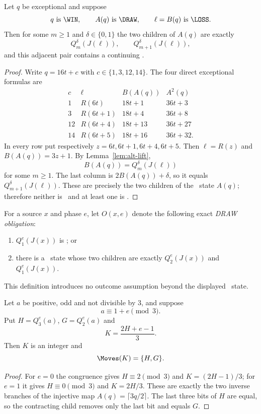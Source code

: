 \begin{lemma}\label{lem:exceptional-side}
Let $q$ be exceptional and suppose
\[
 q\text{ is \WIN},\qquad A(q)\text{ is \DRAW},\qquad
 \ell=B(q)\text{ is \LOSS}.
\]
Then for some $m\ge1$ and $\delta\in\{0,1\}$ the two children of $A(q)$ are
exactly
\[
  Q_m^\delta(J(\ell)),\qquad Q_{m+1}^\delta(J(\ell)),
\]
and this adjacent pair contains a continuing \DRAW.
\end{lemma}

\begin{proof}
Write $q=16t+c$ with $c\in\{1,3,12,14\}$. The four direct exceptional
formulas are
\[
\begin{array}{c|c|c|c}
c&\ell&B(A(q))&A^2(q)\\ \hline
1&R(6t)&18t+1&36t+3\\
3&R(6t+1)&18t+4&36t+8\\
12&R(6t+4)&18t+13&36t+27\\
14&R(6t+5)&18t+16&36t+32.
\end{array}
\]
In every row put respectively $z=6t,6t+1,6t+4,6t+5$. Then
$\ell=R(z)$ and $B(A(q))=3z+1$. By Lemma~\ref{lem:alt-lift},
\[
  B(A(q))=Q_m^\delta(J(\ell))
\]
for some $m\ge1$. The last column is $2B(A(q))+\delta$, so it equals
$Q_{m+1}^\delta(J(\ell))$. These are precisely the two children of the
\DRAW\ state $A(q)$; therefore neither is \LOSS\ and at least one is \DRAW.
\end{proof}

For a source $x$ and phase $e$, let $O(x,e)$ denote the following exact
\emph{DRAW obligation}:
\begin{enumerate}[label=(\alph*)]
\item $Q_1^e(J(x))$ is \DRAW; or
\item there is a \DRAW\ state whose two children are exactly
      $Q_2^e(J(x))$ and $Q_1^e(J(x))$.
\end{enumerate}
This definition introduces no outcome assumption beyond the displayed
\DRAW\ state.

\begin{lemma}\label{lem:hidden-parent}
Let $a$ be positive, odd and not divisible by $3$, and suppose
\[
  a\equiv1+e\pmod3.
\]
Put $H=Q_3^e(a)$, $G=Q_2^e(a)$ and
\[
  K=\frac{2H+e-1}{3}.
\]
Then $K$ is an integer and
\[
  \Moves(K)=\{H,G\}.
\]
\end{lemma}

\begin{proof}
For $e=0$ the congruence gives $H\equiv2\pmod3$ and
$K=(2H-1)/3$; for $e=1$ it gives $H\equiv0\pmod3$ and $K=2H/3$.
These are exactly the two inverse branches of the injective map
$A(q)=\lceil3q/2\rceil$. The last three bits of $H$ are equal, so the
contracting child removes only the last bit and equals $G$.
\end{proof}


